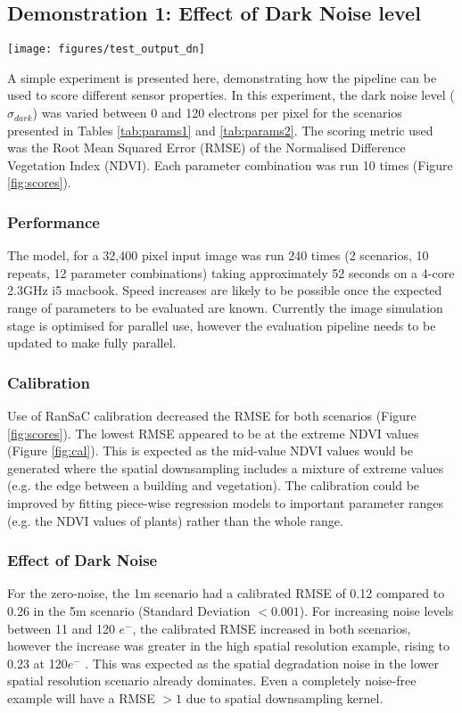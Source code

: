 \documentclass[10pt,a4paper,final,twocolumn]{article}
\begin{document}
\subsection{Demonstration 1: Effect of Dark Noise level}
\begin{figure*}
\centering
\texttt{[image: figures/test\_output\_dn]}
\caption{Uncalibrated (red) and calibrated (black) Root Mean Squared Error for low spatial resolution (solid) and high spatial resolution (dashed) scenarios over a range of dark noise levels}
\label{fig:scores}
\end{figure*}

A simple experiment is presented here, demonstrating how the pipeline can be used to score different sensor properties. In this experiment, the dark noise level ($\sigma_{dark}$) was varied between 0 and 120 electrons per pixel for the scenarios presented in Tables \ref{tab:params1} and \ref{tab:params2}. The scoring metric used was the Root Mean Squared Error (RMSE) of the Normalised Difference Vegetation Index (NDVI).  Each parameter combination was run 10 times (Figure \ref{fig:scores}).

\subsubsection{Performance}
The model, for a 32,400 pixel input image was run 240 times (2 scenarios, 10 repeats, 12 parameter combinations) taking approximately 52 seconds on a 4-core 2.3GHz i5 macbook. Speed increases are likely to be possible once the expected range of parameters to be evaluated are known. Currently the image simulation stage is optimised for parallel use, however the evaluation pipeline needs to be updated to make fully parallel.

\subsubsection{Calibration}
Use of RanSaC calibration decreased the RMSE for both scenarios (Figure \ref{fig:scores}). The lowest RMSE appeared to be at the extreme NDVI values (Figure \ref{fig:cal}). This is expected as the mid-value NDVI values would be generated where the spatial downsampling includes a mixture of extreme values (e.g. the edge between a building and vegetation). The calibration could be improved by fitting piece-wise regression models to important parameter ranges (e.g. the NDVI values of plants) rather than the whole range.

\subsubsection{Effect of Dark Noise}
For the zero-noise, the 1m scenario had a calibrated RMSE of 0.12 compared to 0.26 in the 5m scenario (Standard Deviation $<0.001$). For increasing noise levels between 11 and 120 $e^-$, the calibrated RMSE increased in both scenarios, however the increase was greater in the high spatial resolution example, rising to 0.23 at 120$e^-$ . This was expected as the spatial degradation noise in the lower spatial resolution scenario already dominates. Even a completely noise-free example will have a RMSE $>1$ due to spatial downsampling kernel.
\end{document}
